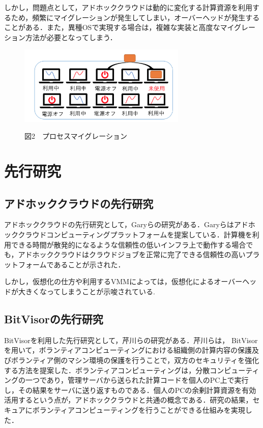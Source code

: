 \documentclass[11pt]{ujarticle} %
\begin{document}
しかし，問題点として，アドホッククラウドは動的に変化する計算資源を利用するため，頻繁にマイグレーションが発生してしまい，オーバーヘッドが発生することがある．また，異種OSで実現する場合は，複雑な実装と高度なマイグレーション方法が必要となってしまう\cite{プロセスマイグレーション}．

\begin{figure}[h]
  \includegraphics[width=8cm]{img/プロセスマイグレーション.png}
\begin{center}図2　プロセスマイグレーション\end{center}
\end{figure}

\section{先行研究}
\subsection{アドホッククラウドの先行研究}
アドホッククラウドの先行研究として，Garyらの研究がある\cite{gary}．Garyらはアドホッククラウドコンピューティングプラットフォームを提案している．計算機を利用できる時間が散発的になるような信頼性の低いインフラ上で動作する場合でも，アドホッククラウドはクラウドジョブを正常に完了できる信頼性の高いプラットフォームであることが示された．

しかし，仮想化の仕方や利用するVMMによっては，仮想化によるオーバーヘッドが大きくなってしまうことが示唆されている.

\subsection{BitVisorの先行研究}
BitVisorを利用した先行研究として，芹川らの研究がある\cite{ボランティア}．芹川らは， BitVisorを用いて，ボランティアコンピューティングにおける組織側の計算内容の保護及びボランティア側のマシン環境の保護を行うことで，双方のセキュリティを強化する方法を提案した．ボランティアコンピューティングは，分散コンピューティングの一つであり，管理サーバから送られた計算コードを個人のPC上で実行し，その結果をサーバに送り返すものである．個人のPCの余剰計算資源を有効活用するという点が，アドホッククラウドと共通の概念である．研究の結果，セキュアにボランティアコンピューティングを行うことができる仕組みを実現した．
\end{document}
